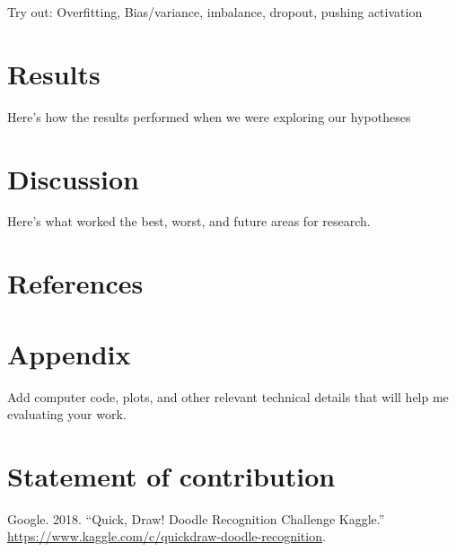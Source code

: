 \documentclass[]{article}
\begin{document}
Try out: Overfitting, Bias/variance, imbalance, dropout, pushing
activation

\section{Results}\label{results}

Here's how the results performed when we were exploring our hypotheses

\section{Discussion}\label{discussion}

Here's what worked the best, worst, and future areas for research.

\section{References}\label{references}

\section{Appendix}\label{appendix}

Add computer code, plots, and other relevant technical details that will
help me evaluating your work.

\section*{Statement of contribution}\label{statement-of-contribution}

\hypertarget{refs}{}
\hypertarget{ref-QuickDra10}{}
Google. 2018. ``Quick, Draw! Doodle Recognition Challenge \textbar{}
Kaggle.'' \url{https://www.kaggle.com/c/quickdraw-doodle-recognition}.
\end{document}
